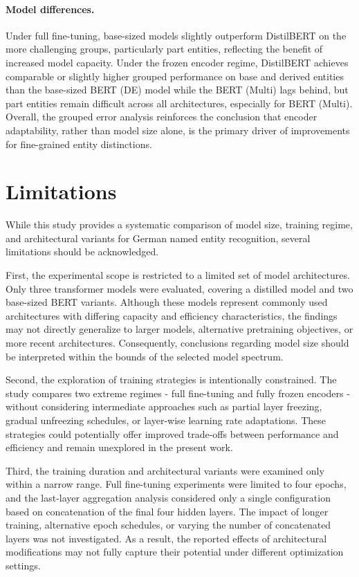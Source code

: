 \documentclass[11pt,a4paper,twocolumn]{article}
\begin{document}
\paragraph{Model differences.}
Under full fine-tuning, base-sized models slightly outperform DistilBERT on the more challenging groups, particularly part entities, reflecting the benefit of increased model capacity.
Under the frozen encoder regime, DistilBERT achieves comparable or slightly higher grouped performance on base and derived entities than the base-sized BERT (DE) model while the BERT (Multi) lags behind, but part entities remain difficult across all architectures, especially for BERT (Multi).
Overall, the grouped error analysis reinforces the conclusion that encoder adaptability, rather than model size alone, is the primary driver of improvements for fine-grained entity distinctions.


\section{Limitations}

While this study provides a systematic comparison of model size, training regime, and architectural variants for German named entity recognition, several limitations should be acknowledged.

First, the experimental scope is restricted to a limited set of model architectures. Only three transformer models were evaluated, covering a distilled model and two base-sized BERT variants. Although these models represent commonly used architectures with differing capacity and efficiency characteristics, the findings may not directly generalize to larger models, alternative pretraining objectives, or more recent architectures. Consequently, conclusions regarding model size should be interpreted within the bounds of the selected model spectrum.

Second, the exploration of training strategies is intentionally constrained. The study compares two extreme regimes - full fine-tuning and fully frozen encoders - without considering intermediate approaches such as partial layer freezing, gradual unfreezing schedules, or layer-wise learning rate adaptations. These strategies could potentially offer improved trade-offs between performance and efficiency and remain unexplored in the present work.

Third, the training duration and architectural variants were examined only within a narrow range. Full fine-tuning experiments were limited to four epochs, and the last-layer aggregation analysis considered only a single configuration based on concatenation of the final four hidden layers. The impact of longer training, alternative epoch schedules, or varying the number of concatenated layers was not investigated. As a result, the reported effects of architectural modifications may not fully capture their potential under different optimization settings.
\end{document}
